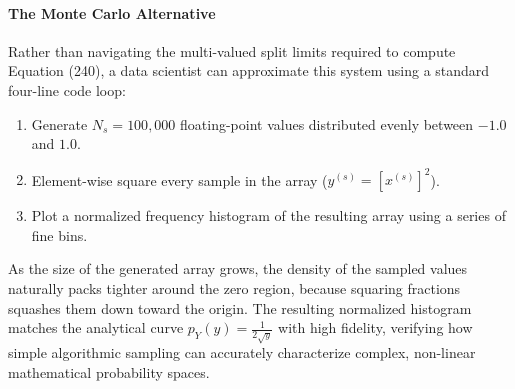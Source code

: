 \documentclass{article}
\begin{document}
\paragraph{The Monte Carlo Alternative}
Rather than navigating the multi-valued split limits required to compute Equation (240), a data scientist can approximate this system using a standard four-line code loop:

\begin{tcolorbox}[colback=gray!5!white, colframe=gray!60!black, title=Conceptual Monte Carlo Execution Engine]
\begin{enumerate}
    \item Generate $N_s = 100,000$ floating-point values distributed evenly between $-1.0$ and $1.0$.
    \item Element-wise square every sample in the array ($y^{(s)} = [x^{(s)}]^2$).
    \item Plot a normalized frequency histogram of the resulting array using a series of fine bins.
\end{enumerate}
\end{tcolorbox}

As the size of the generated array grows, the density of the sampled values naturally packs tighter around the zero region, because squaring fractions squashes them down toward the origin. The resulting normalized histogram matches the analytical curve $p_Y(y) = \frac{1}{2\sqrt{y}}$ with high fidelity, verifying how simple algorithmic sampling can accurately characterize complex, non-linear mathematical probability spaces.
\end{document}
